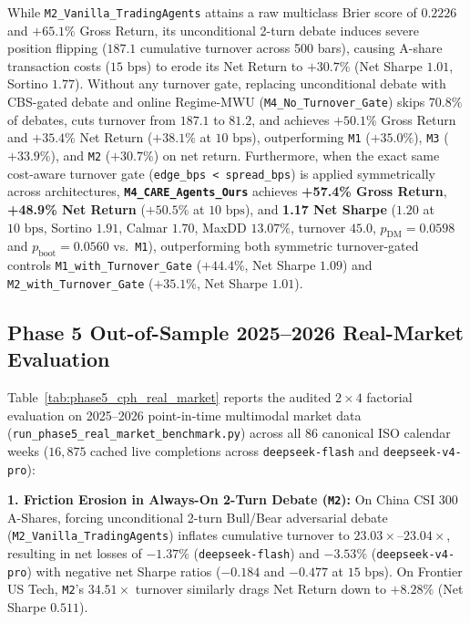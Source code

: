 \documentclass[10pt,a4paper,twocolumn]{article}
\begin{document}
While \texttt{M2\_Vanilla\_TradingAgents} attains a raw multiclass Brier score of $0.2226$ and $+65.1\%$ Gross Return, its unconditional 2-turn debate induces severe position flipping ($187.1$ cumulative turnover across 500 bars), causing A-share transaction costs ($15\text{ bps}$) to erode its Net Return to $+30.7\%$ (Net Sharpe $1.01$, Sortino $1.77$). Without any turnover gate, replacing unconditional debate with CBS-gated debate and online Regime-MWU (\texttt{M4\_No\_Turnover\_Gate}) skips $70.8\%$ of debates, cuts turnover from $187.1$ to $81.2$, and achieves $+50.1\%$ Gross Return and $+35.4\%$ Net Return ($+38.1\%$ at $10\text{ bps}$), outperforming \texttt{M1} ($+35.0\%$), \texttt{M3} ($+33.9\%$), and \texttt{M2} ($+30.7\%$) on net return. Furthermore, when the exact same cost-aware turnover gate (\texttt{edge\_bps < spread\_bps}) is applied symmetrically across architectures, \textbf{\texttt{M4\_CARE\_Agents\_Ours}} achieves \textbf{+57.4\% Gross Return}, \textbf{+48.9\% Net Return} ($+50.5\%$ at $10\text{ bps}$), and \textbf{1.17 Net Sharpe} ($1.20$ at $10\text{ bps}$, Sortino $1.91$, Calmar $1.70$, MaxDD $13.07\%$, turnover $45.0$, $p_{\text{DM}} = 0.0598$ and $p_{\text{boot}} = 0.0560$ vs.\ \texttt{M1}), outperforming both symmetric turnover-gated controls \texttt{M1\_with\_Turnover\_Gate} ($+44.4\%$, Net Sharpe $1.09$) and \texttt{M2\_with\_Turnover\_Gate} ($+35.1\%$, Net Sharpe $1.01$).

\subsection{Phase 5 Out-of-Sample 2025--2026 Real-Market Evaluation}

Table~\ref{tab:phase5_cph_real_market} reports the audited $2\times 4$ factorial evaluation on 2025--2026 point-in-time multimodal market data (\texttt{run\_phase5\_real\_market\_benchmark.py}) across all $86$ canonical ISO calendar weeks ($16,875$ cached live completions across \texttt{deepseek-flash} and \texttt{deepseek-v4-pro}):

\noindent\textbf{1. Friction Erosion in Always-On 2-Turn Debate (\texttt{M2}):} On China CSI 300 A-Shares, forcing unconditional 2-turn Bull/Bear adversarial debate (\texttt{M2\_Vanilla\_TradingAgents}) inflates cumulative turnover to $23.03\times$--$23.04\times$, resulting in net losses of $-1.37\%$ (\texttt{deepseek-flash}) and $-3.53\%$ (\texttt{deepseek-v4-pro}) with negative net Sharpe ratios ($-0.184$ and $-0.477$ at $15\text{ bps}$). On Frontier US Tech, \texttt{M2}'s $34.51\times$ turnover similarly drags Net Return down to $+8.28\%$ (Net Sharpe $0.511$).
\end{document}
